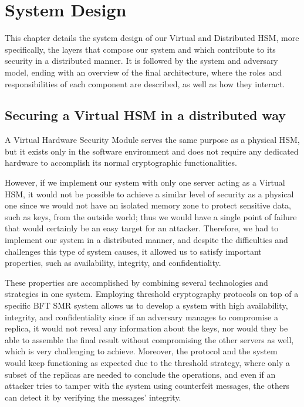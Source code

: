 \chapter{System Design}  \label{chap:system-design}

This chapter details the system design of our Virtual and Distributed HSM, more specifically, the layers that compose our system and which contribute to its security in a distributed manner. It is followed by the system and adversary model, ending with an overview of the final architecture, where the roles and responsibilities of each component are described, as well as how they interact.

\section{Securing a Virtual HSM in a distributed way} \label{sec:securing-hsm}

A Virtual Hardware Security Module serves the same purpose as a physical HSM, but it exists only in the software environment and does not require any dedicated hardware to accomplish its normal cryptographic functionalities.

However, if we implement our system with only one server acting as a Virtual HSM, it would not be possible to achieve a similar level of security as a physical one since we would not have an isolated memory zone to protect sensitive data, such as keys, from the outside world; thus we would have a single point of failure that would certainly be an easy target for an attacker. Therefore, we had to implement our system in a distributed manner, and despite the difficulties and challenges this type of system causes, it allowed us to satisfy important properties, such as availability, integrity, and confidentiality.   

These properties are accomplished by combining several technologies and strategies in one system. Employing threshold cryptography protocols on top of a specific BFT SMR system allows us to develop a system with high availability, integrity, and confidentiality since if an adversary manages to compromise a replica, it would not reveal any information about the keys, nor would they be able to assemble the final result without compromising the other servers as well, which is very challenging to achieve. Moreover, the protocol and the system would keep functioning as expected due to the threshold strategy, where only a subset of the replicas are needed to conclude the operations, and even if an attacker tries to tamper with the system using counterfeit messages, the others can detect it by verifying the messages' integrity.

